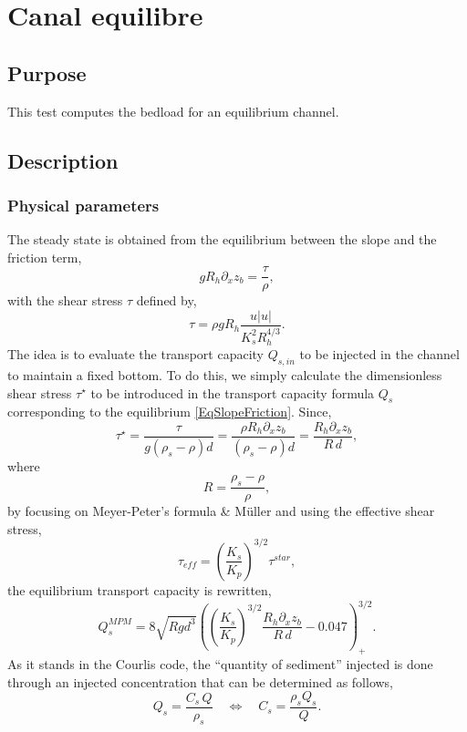 \chapter{Canal equilibre}\label{chapter:Canal equilibre}

\section{Purpose}

This test computes the bedload for an equilibrium channel.

\section{Description}

\subsection{Physical parameters}

The steady state is obtained from the equilibrium between the slope
and the friction term,
\begin{equation}
\label{EqSlopeFriction}
  g R_h \partial_x z_b = \dfrac{\tau}{\rho},
\end{equation}
with the shear stress $\tau$ defined by,
\[
  \tau = \rho g R_h \dfrac{u |u|}{K_s^2 R_h^{4/3}}.
\]
The idea is to evaluate the transport capacity $Q_{s,in}$ to be 
injected in the channel to maintain a fixed bottom. To do this, we
simply calculate the dimensionless shear stress $\tau^{\star}$
to be introduced in the transport capacity formula $Q_s$ 
corresponding to the equilibrium \eqref{EqSlopeFriction}.
Since,
\begin{equation}
  \tau^{\star} = \dfrac{\tau}{g(\rho_s-\rho)d} = 
  \dfrac{\rho R_h \partial_x z_b}{(\rho_s-\rho)d} = 
  \dfrac{R_h \partial_x z_b}{R\,d},
\end{equation}
where
\[
  R = \dfrac{\rho_s-\rho}{\rho},
\]
by focusing on Meyer-Peter's formula \& M\"uller and using the 
effective shear stress, 
\begin{equation}
  \tau_{eff} = \left( \dfrac{K_s}{K_p} \right)^{3/2} \tau^{star},
\end{equation}
the equilibrium transport capacity is rewritten,
\begin{equation}
  Q_s^{MPM} = 
  8 \sqrt{Rgd^3}\left( \left( \dfrac{K_s}{K_p} \right)^{3/2} 
  \dfrac{R_h \partial_x z_b}{R\,d} - 0.047 \right)_+^{3/2}.
\end{equation}
As it stands in the Courlis code, the ``quantity of sediment'' injected
is done through an injected concentration that can be determined as 
follows,
\begin{equation}
  Q_s = \dfrac{C_s \, Q}{\rho_s} \quad \Longleftrightarrow \quad C_s =
  \dfrac{\rho_s Q_s}{Q}.
\end{equation}

